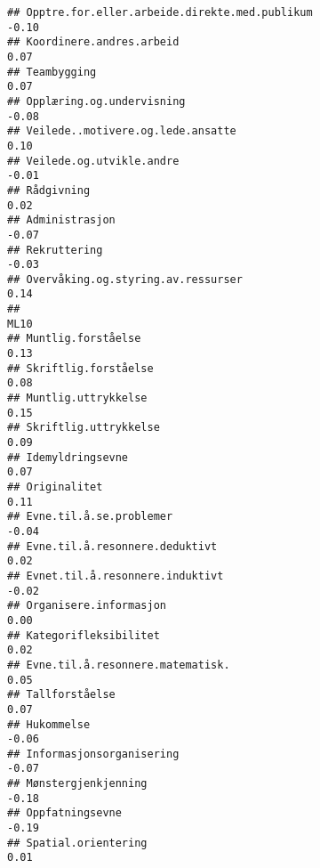 \documentclass[
]{article}
\begin{document}
\begin{verbatim}
## Opptre.for.eller.arbeide.direkte.med.publikum                                    -0.10
## Koordinere.andres.arbeid                                                          0.07
## Teambygging                                                                       0.07
## Opplæring.og.undervisning                                                        -0.08
## Veilede..motivere.og.lede.ansatte                                                 0.10
## Veilede.og.utvikle.andre                                                         -0.01
## Rådgivning                                                                        0.02
## Administrasjon                                                                   -0.07
## Rekruttering                                                                     -0.03
## Overvåking.og.styring.av.ressurser                                                0.14
##                                                                                   ML10
## Muntlig.forståelse                                                                0.13
## Skriftlig.forståelse                                                              0.08
## Muntlig.uttrykkelse                                                               0.15
## Skriftlig.uttrykkelse                                                             0.09
## Idemyldringsevne                                                                  0.07
## Originalitet                                                                      0.11
## Evne.til.å.se.problemer                                                          -0.04
## Evne.til.å.resonnere.deduktivt                                                    0.02
## Evnet.til.å.resonnere.induktivt                                                  -0.02
## Organisere.informasjon                                                            0.00
## Kategorifleksibilitet                                                             0.02
## Evne.til.å.resonnere.matematisk.                                                  0.05
## Tallforståelse                                                                    0.07
## Hukommelse                                                                       -0.06
## Informasjonsorganisering                                                         -0.07
## Mønstergjenkjenning                                                              -0.18
## Oppfatningsevne                                                                  -0.19
## Spatial.orientering                                                               0.01

\end{verbatim}
\end{document}

